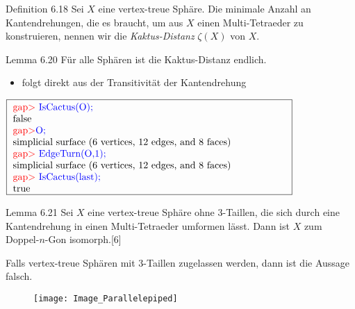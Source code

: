 \documentclass{beamer}
\begin{document}
\begin{frame}
\begin{block}{Definition 6.18}
Sei $X$ eine vertex-treue Sphäre. Die minimale Anzahl an Kantendrehungen, die es braucht, um aus $X$ einen Multi-Tetraeder zu  konstruieren, nennen wir die \emph{Kaktus-Distanz} $\zeta(X)$ von $X$.
\end{block}
\end{frame}
\begin{frame}
\begin{block}{Lemma 6.20}
Für alle Sphären ist die Kaktus-Distanz endlich.
\end{block}
\pause
\begin{itemize}
\item folgt direkt aus der Transitivität der Kantendrehung
\end{itemize}
\end{frame}
\begin{frame}
\begin{center}
$\fbox{
\parbox{10cm}{
\textcolor{red}{gap$>$} \textcolor{blue}{IsCactus(O);}\\
false\\
\textcolor{red}{gap$>$}\textcolor{blue}{ O;}\\
simplicial surface (6 vertices, 12 edges, and 8 faces)\\
\textcolor{red}{gap$>$} \textcolor{blue}{EdgeTurn(O,1);}\\
simplicial surface (6 vertices, 12 edges, and 8 faces)\\
\textcolor{red}{gap$>$} \textcolor{blue}{IsCactus(last);}\\
true
}}$
\end{center}
\end{frame}
\begin{frame}
\begin{block}{Lemma 6.21}
Sei $X$ eine vertex-treue Sphäre ohne 3-Taillen, die  sich durch eine Kantendrehung in einen Multi-Tetraeder umformen lässt. Dann ist $X$  zum Doppel-$n$-Gon isomorph.[6]
\end{block}
\end{frame}
\begin{frame}
Falls vertex-treue Sphären mit 3-Taillen zugelassen werden, dann ist die Aussage falsch. \pause
\begin{figure}[H]
\begin{center}
\texttt{[image: Image\_Parallelepiped]}
\end{center}
\end{figure}
\end{frame}
\end{document}
